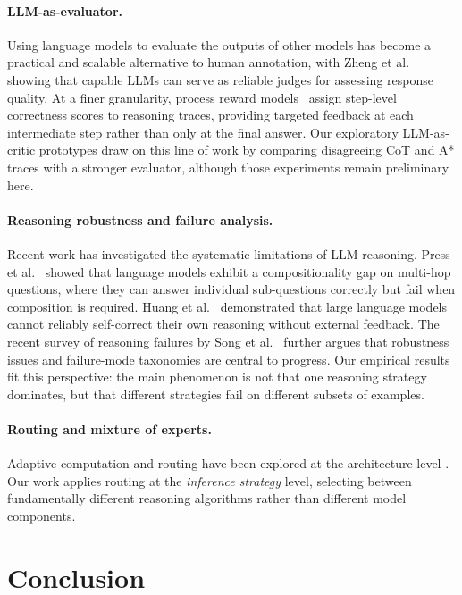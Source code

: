 \documentclass[11pt]{article}
\begin{document}
\paragraph{LLM-as-evaluator.} Using language models to evaluate the outputs of other models has become a practical and scalable alternative to human annotation, with Zheng et al.~\cite{zheng2023judging} showing that capable LLMs can serve as reliable judges for assessing response quality. At a finer granularity, process reward models~\cite{lightman2023let} assign step-level correctness scores to reasoning traces, providing targeted feedback at each intermediate step rather than only at the final answer. Our exploratory LLM-as-critic prototypes draw on this line of work by comparing disagreeing CoT and A* traces with a stronger evaluator, although those experiments remain preliminary here.

\paragraph{Reasoning robustness and failure analysis.} Recent work has investigated the systematic limitations of LLM reasoning. Press et al.~\cite{press2023measuring} showed that language models exhibit a compositionality gap on multi-hop questions, where they can answer individual sub-questions correctly but fail when composition is required. Huang et al.~\cite{huang2023large} demonstrated that large language models cannot reliably self-correct their own reasoning without external feedback. The recent survey of reasoning failures by Song et al.~\cite{song2026failures} further argues that robustness issues and failure-mode taxonomies are central to progress. Our empirical results fit this perspective: the main phenomenon is not that one reasoning strategy dominates, but that different strategies fail on different subsets of examples.

\paragraph{Routing and mixture of experts.} Adaptive computation and routing have been explored at the architecture level \citep{lian2024llmgrounded}. Our work applies routing at the \emph{inference strategy} level, selecting between fundamentally different reasoning algorithms rather than different model components.

\section{Conclusion}
\label{sec:conclusion}
\end{document}
